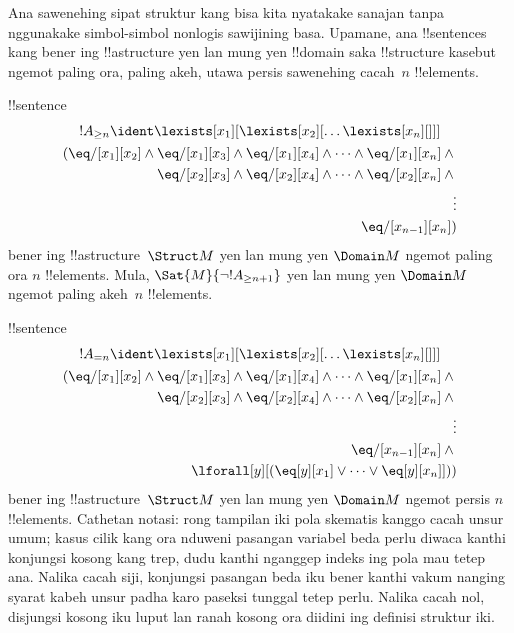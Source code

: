 \documentclass[../../../include/open-logic-section]{subfiles}
\begin{document}


\begin{explain}
Ana sawenehing sipat struktur kang bisa kita nyatakake
sanajan tanpa nggunakake simbol-simbol nonlogis sawijining
basa. Upamane, ana !!{sentence}s kang bener ing
!!a{structure} yen lan mung yen !!{domain} saka
!!{structure} kasebut ngemot paling ora, paling akeh,
utawa persis sawenehing cacah~$n$ !!{element}s.
\end{explain}

\begin{prop}
!!{sentence}
\begin{multline*}
  !A_{\ge n} \ident \lexists[x_1][\lexists[x_2][\dots\lexists[x_n][{}]]]\\
  \begin{aligned}
  (\eq/[x_1][x_2] \land {}
  \eq/[x_1][x_3] \land \eq/[x_1][x_4] \land \dots \land \eq/[x_1][x_n] \land {}\\
\eq/[x_2][x_3] \land \eq/[x_2][x_4] \land \dots \land {} \eq/[x_2][x_n] \land {} \\
\vdots\\
\eq/[x_{n-1}][x_n])
\end{aligned}
\end{multline*}
bener ing !!a{structure}~$\Struct M$ yen lan
mung yen $\Domain M$ ngemot paling ora
$n$ !!{element}s. Mula,
$\Sat{M}{\lnot !A_{\ge n+1}}$ yen lan mung
yen $\Domain M$ ngemot paling akeh~$n$
!!{element}s.

\end{prop}

\begin{prop}
!!{sentence}
\begin{multline*}
!A_{= n} \ident \lexists[x_1][\lexists[x_2][\dots\lexists[x_n][{}]]] \\
\begin{aligned}
  (\eq/[x_1][x_2] \land {}
  \eq/[x_1][x_3] \land \eq/[x_1][x_4] \land \dots \land \eq/[x_1][x_n] \land {}\\
\eq/[x_2][x_3] \land \eq/[x_2][x_4] \land \dots \land {} \eq/[x_2][x_n] \land {} \\
\vdots\\
\eq/[x_{n-1}][x_n] \land {} \\
\lforall[y][(\eq[y][x_1] \lor \dots \lor \eq[y][x_n]]))
\end{aligned}
\end{multline*}
bener ing !!a{structure}~$\Struct M$ yen lan
mung yen $\Domain M$ ngemot persis
$n$ !!{element}s.
Cathetan notasi: rong tampilan iki pola skematis
kanggo cacah unsur umum; kasus cilik kang ora
nduweni pasangan variabel beda perlu diwaca
kanthi konjungsi kosong kang trep, dudu
kanthi nganggep indeks ing pola mau tetep ana. Nalika cacah siji, konjungsi pasangan beda iku bener kanthi vakum nanging syarat kabeh unsur padha karo paseksi tunggal tetep perlu. Nalika cacah nol, disjungsi kosong iku luput lan ranah kosong ora diidini ing definisi struktur iki.
\end{prop}
\end{document}
